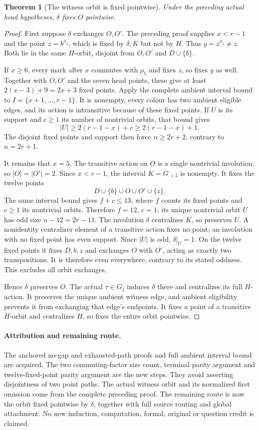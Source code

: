 \documentclass[11pt,a4paper]{article}
\newtheorem{theorem}[lemma]{Theorem}
\begin{document}
\begin{theorem}[The witness orbit is fixed pointwise]
Under the preceding actual head hypotheses, $\delta$
fixes $O$ pointwise.
\end{theorem}
\begin{proof}
First suppose $\delta$ exchanges $O,O'$. The preceding
proof supplies $x<r-1$ and the point $z=b^{\rho_4}$,
which is fixed by $\delta,K$ but not by $H$.
Thus $y=z^{\rho_5}\ne z$. Both lie in the same
$H$-orbit, disjoint from $O,O'$ and $D\cup\{b\}$.

If $x\ge6$, every mark after $x$ commutes with
$\rho_5$ and fixes $z$, so fixes $y$ as well.
Together with $O,O'$ and the seven head points,
these give at least $2(x-3)+9=2x+3$ fixed points.
Apply the complete ambient interval bound to
$I=\{x+1,\ldots,r-1\}$. It is nonempty, every
colour has two ambient eligible edges, and its
action is intransitive because of these fixed
points. If $U$ is its support and $c\ge1$ its
number of nontrivial orbits, that bound gives
\[
 |U|\ge2(r-1-x)+c\ge2(r-1-x)+1.
\]
The disjoint fixed points and support then force
$n\ge2r+2$, contrary to $n=2r+1$.

It remains that $x=5$. The transitive action on
$O$ is a single nontrivial involution, so
$|O|=|O'|=2$. Since $x<r-1$, the interval
$K=G_{>5}$ is nonempty. It fixes the twelve
points
\[
             D\cup\{b\}\cup O\cup O'\cup\{z\}.
\]
The same interval bound gives $f+c\le13$, where
$f$ counts its fixed points and $c\ge1$ its
nontrivial orbits. Therefore $f=12$, $c=1$;
its unique nontrivial orbit $U$ has odd size
$n-12=2r-11$. The involution $\delta$ centralizes
$K$, so preserves $U$. A nonidentity centralizer
element of a transitive action fixes no point;
an involution with no fixed point has even
support. Since $|U|$ is odd, $\delta|_U=1$.
On the twelve fixed points it fixes $D,b,z$ and
exchanges $O$ with $O'$, acting as exactly two
transpositions. It is therefore even everywhere,
contrary to its stated oddness. This excludes
all orbit exchanges.

Hence $\delta$ preserves $O$. The actual
$\tau\in G_j$ induces $\delta$ there and
centralizes its full $H$-action. It preserves
the unique ambient witness edge, and ambient
eligibility prevents it from exchanging that
edge's endpoints. It fixes a point of a
transitive $H$-orbit and centralizes $H$, so
fixes the entire orbit pointwise.
\end{proof}

\paragraph{Attribution and remaining route.}
The anchored no-gap and exhausted-path proofs and
full ambient interval bound are acquired. The two
commuting-factor size count, terminal parity argument
and twelve-fixed-point parity argument are the new
steps. They avoid asserting disjointness of two point
paths. The actual witness orbit and its normalized
first omission come from the complete preceding proof.
The remaining route is now the orbit fixed pointwise
by $\delta$, together with full source routing and
global attachment. No new induction, computation,
formal, original or question credit is claimed.
\end{document}
